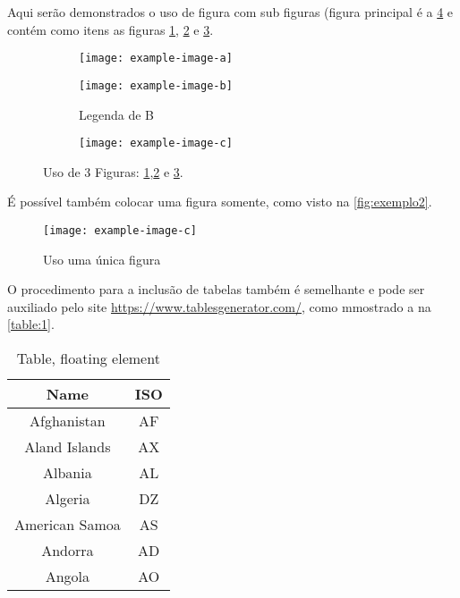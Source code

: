  \label{sec:resultados}

Aqui serão demonstrados o uso de figura com sub figuras (figura principal é a \ref{fig:exemplo1} e contém como itens as figuras \ref{fig:subfiguraa}, \ref{fig:subfigurab} e \ref{fig:subfigurac}.

\begin{figure}
    \centering    
    \begin{subfigure}{0.3\textwidth}
        \centering
        \texttt{[image: example-image-a]}
        \caption{} \label{fig:subfiguraa}
    \end{subfigure}\hfil
    \begin{subfigure}{0.3\textwidth}
        \centering
        \texttt{[image: example-image-b]}
        \caption{Legenda de B}\label{fig:subfigurab}
    \end{subfigure}\hfil
    \begin{subfigure}{0.3\textwidth}
        \centering
        \texttt{[image: example-image-c]}
        \caption{} \label{fig:subfigurac}
    \end{subfigure}%
    \label{fig:exemplo1}
    \caption{
        Uso de 3 Figuras: \ref{fig:subfiguraa},\ref{fig:subfigurab} e \ref{fig:subfigurac}.
    }
\end{figure}

É possível também colocar uma figura somente, como visto na \autoref{fig:exemplo2}.

\begin{figure}
    \centering
    \texttt{[image: example-image-c]}        
    \label{fig:exemplo2}
    \caption{Uso uma única figura}
\end{figure}


O procedimento para a inclusão de tabelas também é semelhante e pode ser auxiliado pelo site \url{https://www.tablesgenerator.com/}, como mmostrado a na \autoref{table:1}.



\begin{table}
    \centering
    \begin{tabular}{|c|c|}
    \hline
    Name & ISO \\
    \hline
    Afghanistan & AF \\
    Aland Islands & AX \\
    Albania    &AL  \\
    Algeria   &DZ \\
    American Samoa & AS \\
    Andorra & AD   \\
    Angola & AO \\
    \hline
    \end{tabular}
    \caption{Table, floating element}
\label{table:1}
\end{table}

